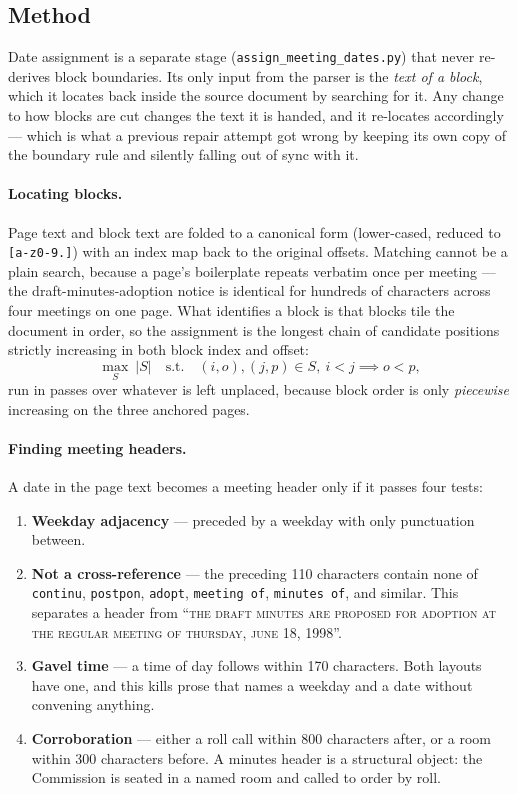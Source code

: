 \documentclass[11pt]{article}
\begin{document}
\subsection{Method}

Date assignment is a separate stage (\texttt{assign\_meeting\_dates.py}) that never
re-derives block boundaries. Its only input from the parser is the \emph{text of a block},
which it locates back inside the source document by searching for it. Any change to how
blocks are cut changes the text it is handed, and it re-locates accordingly --- which is
what a previous repair attempt got wrong by keeping its own copy of the boundary rule and
silently falling out of sync with it.

\paragraph{Locating blocks.} Page text and block text are folded to a canonical form
(lower-cased, reduced to \texttt{[a-z0-9.]}) with an index map back to the original
offsets. Matching cannot be a plain search, because a page's boilerplate repeats verbatim
once per meeting --- the draft-minutes-adoption notice is identical for hundreds of
characters across four meetings on one page. What identifies a block is that blocks tile
the document in order, so the assignment is the longest chain of candidate positions
strictly increasing in both block index and offset:
\[
\max_{S}\ |S| \quad \text{s.t.}\quad (i,o),(j,p)\in S,\ i<j \implies o<p ,
\]
run in passes over whatever is left unplaced, because block order is only \emph{piecewise}
increasing on the three anchored pages.

\paragraph{Finding meeting headers.} A date in the page text becomes a meeting header only
if it passes four tests:

\begin{enumerate}
\item \textbf{Weekday adjacency} --- preceded by a weekday with only punctuation between.
\item \textbf{Not a cross-reference} --- the preceding 110 characters contain none of
\texttt{continu}, \texttt{postpon}, \texttt{adopt}, \texttt{meeting of}, \texttt{minutes
of}, and similar. This separates a header from ``\textsc{the draft minutes are proposed for
adoption at the regular meeting of thursday, june 18, 1998}''.
\item \textbf{Gavel time} --- a time of day follows within 170 characters. Both layouts
have one, and this kills prose that names a weekday and a date without convening anything.
\item \textbf{Corroboration} --- either a roll call within 800 characters after, or a room
within 300 characters before. A minutes header is a structural object: the Commission is
seated in a named room and called to order by roll.
\end{enumerate}
\end{document}
